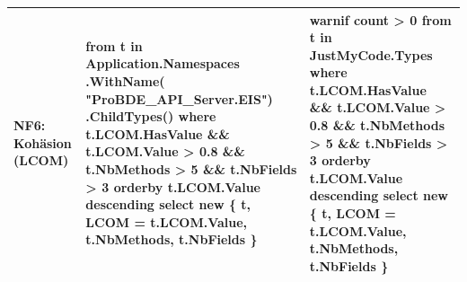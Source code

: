 \begin{longtable}{|>{\raggedright\arraybackslash}p{}|>{\raggedright\arraybackslash}p{}|>{\raggedright\arraybackslash}p{}|}
NF6: Kohäsion (LCOM) &
{\ttfamily
from t in Application.Namespaces\newline
\quad .WithName(\newline
\quad \quad "ProBDE\_API\_Server.EIS")\newline
\quad .ChildTypes()\newline
where t.LCOM.HasValue \newline
\quad \&\& t.LCOM.Value > 0.8\newline
\quad \&\& t.NbMethods > 5 \newline
\quad \&\& t.NbFields > 3\newline
orderby t.LCOM.Value descending\newline
select new \{ t, \newline
\quad LCOM = t.LCOM.Value, \newline
\quad t.NbMethods, t.NbFields \}
}
&
{\ttfamily
warnif count > 0\newline
from t in JustMyCode.Types\newline
where t.LCOM.HasValue \newline
\quad \&\& t.LCOM.Value > 0.8\newline
\quad \&\& t.NbMethods > 5 \newline
\quad \&\& t.NbFields > 3\newline
orderby t.LCOM.Value descending\newline
select new \{ t, \newline
\quad LCOM = t.LCOM.Value, \newline
\quad t.NbMethods, t.NbFields \}
}
\\ \hline


\end{longtable}
